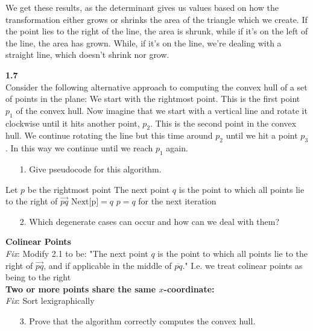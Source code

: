 We get these results, as the determinant gives us values based on how the transformation either grows or shrinks the area of the triangle which we create. If the point lies to the right of the line, the area is shrunk, while if it's on the left of the line, the area has grown. While, if it's on the line, we're dealing with a straight line, which doesn't shrink nor grow.

\noindent
\textbf{1.7}\\
\noindent
Consider the following alternative approach to computing the convex hull of a set of points in the plane: We start with the rightmost point. This is the first point $p_{1}$ of the convex hull. Now imagine that we start with a vertical line and rotate it clockwise until it hits another point, $p_{2}$. This is the second point in the convex hull. We continue rotating the line but this time around $p_{2}$ until we hit a point $p_{3}$. In this way we continue until we reach $p_{1}$ again.

\begin{enumerate}
	\item[1.] Give pseudocode for this algorithm.
\end{enumerate}


\begin{algorithmic}
	\STATE Let $p$ be the rightmost point
	\STATE The next point $q$ is the point to which all points lie to the right of $\overrightarrow{pq}$
	\STATE $\text{Next[p]} = q$
	\STATE $p = q$ for the next iteration
	\ENDWHILE
\end{algorithmic}

\begin{enumerate}
	\item[2.] Which degenerate cases can occur and how can we deal with them?
\end{enumerate}
\textbf{Colinear Points}\\
\noindent
\textit{Fix}: Modify 2.1 to be: "The next point $q$ is the point to which all points lie to the right of $\overrightarrow{pq}$, and if applicable in the middle of $\overline{pq}$."
I.e. we treat colinear points as being to the right\\
\noindent
\textbf{Two or more points share the same $x$-coordinate:}\\
\noindent
\textit{Fix}: Sort lexigraphically


\begin{enumerate}
	\item[3.] Prove that the algorithm correctly computes the convex hull.
\end{enumerate}

